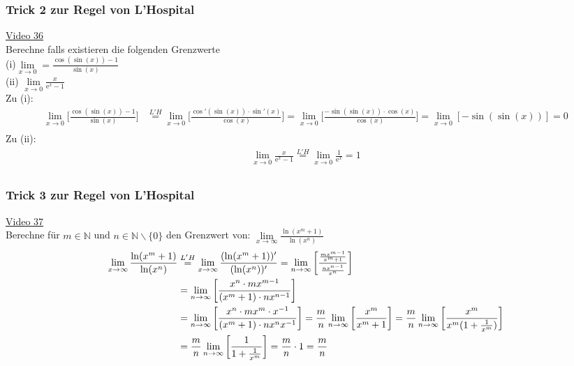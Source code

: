 \subsubsection{Trick 2 zur Regel von L’Hospital}
\href{https://youtu.be/MozzXCc8xNM}{Video 36}\\
Berechne falls existieren die folgenden Grenzwerte\\
(i)\;\;$ \lim\limits_ {x\to 0}=\frac{\cos(\sin(x))-1}{\sin(x)} $\\
(ii) $ \lim\limits_ {x\to 0}\frac{x}{\mathrm{e}^x-1} $\vspace*{2mm}\\
Zu (i):\\
\begin{align*}
\lim\limits_ {x\to 0}\bigg[\frac{\cos(\sin(x))-1}{\sin(x)}\bigg]&\overset{L'H}{=}\lim\limits_ {x\to 0}\bigg[\frac{\cos'(\sin(x))\cdot \sin'(x)}{\cos(x)}\bigg]=\lim\limits_ {x\to 0}\bigg[\frac{-\sin(\sin(x))\cdot \cos(x)}{\cos(x)}\bigg]=\lim\limits_ {x\to 0}[-\sin(\sin(x))]=0\\
\end{align*}
Zu (ii):\
\begin{align*}
\lim\limits_ {x\to 0}\frac{x}{\mathrm{e}^x-1}\overset{L'H}{=}\lim\limits_ {x\to 0}\frac{1}{\mathrm{e}^x}=1\\
\end{align*}
\subsubsection{Trick 3 zur Regel von L’Hospital}
\href{https://youtu.be/ODertm5pPaU}{Video 37 }\\
Berechne für $ m\in \mathbb{N} $ und $ n\in \mathbb{N}\backslash\{0\} $ den Grenzwert von: $\lim\limits_ {x\to\infty}\frac{\ln(x^m+1)}{\ln(x^n)}$\\
\begin{align*}
\lim\limits_ {x\to\infty}\frac{\ln(x^m+1)}{\ln(x^n)}&\overset{L'H}{=}\lim\limits_ {x\to\infty}\frac{(\ln(x^m+1))'}{(\ln(x^n))'}=\lim\limits_ {n\to\infty}\bigg[\frac{\genfrac{}{}{}{2}{mx^{m-1} }{x^m+1 }}{\genfrac{}{}{}{2}{nx^{n-1}}{x^{n} }}\bigg]\\
&=\lim\limits_ {n\to\infty}\bigg[\frac{x^n\cdot mx^{m-1}}{(x^{m}+1)\cdot nx^{n-1}}\bigg]\\
&=\lim\limits_ {n\to\infty}\bigg[\frac{x^n\cdot mx^m\cdot x^{-1}}{(x^m +1)\cdot nx^nx^{-1}}\bigg]=\frac{m}{n}\lim\limits_ {n\to\infty}\bigg[\frac{x^m}{x^{m}+1}\bigg]=\frac{m}{n}\lim\limits_ {n\to\infty}\bigg[\frac{x^m}{x^m(1+\frac{1}{x^m})}\bigg]\\
&=\frac{m}{n}\lim\limits_ {n\to\infty}\bigg[\frac{1}{1+\frac{1}{x^m}}\bigg]=\frac{m}{n}\cdot 1=\frac{m}{n}\\
\end{align*}
